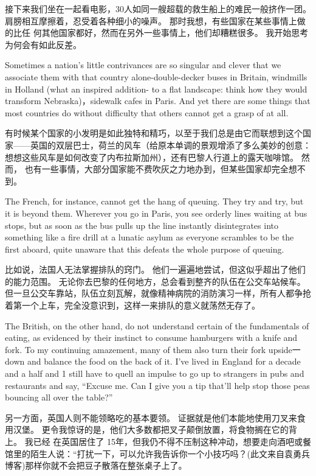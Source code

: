 \documentclass[cs4size, a4paper, 12pt]{article}
\newcounter{numpar}
\newcommand*{\newpar}{\numpar{}}
\begin{document}
	接下来我们坐在一起看电影，30人如同一艘超载的救生船上的难民一般挤作一团。 肩膀相互摩擦着，忍受着各种细小的噪声。 那时我想，有些国家在某些事情上做的比任 何其他国家都好，然而在另外一些事情上，他们却糟糕很多。 我开始思考为何会有如此反差。 
	
	\newpar Sometimes a nation's little contrivances are so singular and clever that we associate them with that country alone-double-decker buses in Britain, windmills in Holland (what an inspired addition- to a flat landscape: think how they would transform Nebraska)，sidewalk cafes in Paris. And yet there are some things that most countries do without difficulty that others cannot get a grasp of at all.
	
	有时候某个国家的小发明是如此独特和精巧，以至于我们总是由它而联想到这个国家——英国的双层巴士，荷兰的风车（给原本单调的景观增添了多么美妙的创意：想想这些风车是如何改变了内布拉斯加州），还有巴黎人行道上的露天咖啡馆。 然而， 也有一些事情，大部分国家能不费吹灰之力地办到，但某些国家却完全想不到。 
	
	\newpar The French, for instance, cannot get the hang of queuing. They try and try, but it is beyond them. Wherever you go in Paris, you see orderly lines waiting at bus stops, but as soon as the bus pulls up the line instantly disintegrates into something like a fire drill at a lunatic asylum as everyone scrambles to be the first aboard, quite unaware that this defeats the whole purpose of queuing.
	
	比如说，法国人无法掌握排队的窍门。 他们一遍遍地尝试，但这似乎超出了他们的能力范围。 无论你去巴黎的任何地方，总会看到整齐的队伍在公交车站候车。 但一旦公交车靠站，队伍立刻瓦解，就像精神病院的消防演习一样，所有人都争抢着第一个上车，完全没意识到，这样一来排队的意义就荡然无存了。 
	
	\newpar The British, on the other hand, do not understand certain of the fundamentals of eating, as evidenced by their instinct to consume hamburgers with a knife and fork. To my continuing amazement, many of them also turn their fork upside一down and balance the food on the back of it. I’ve lived in England for a decade and a half and 1 still have to quell an impulse to go up to strangers in pubs and restaurants and say, ``Excuse me. Can I give you a tip that'll help stop those peas bouncing all over the table?''
	
	另一方面，英国人则不能领略吃的基本要领。 证据就是他们本能地使用刀叉来食用汉堡。 更令我惊讶的是，他们大多数都把叉子颠倒放置，将食物搁在它的背上。 我已经 在英国居住了 15年，但我仍不得不压制这种冲动，想要走向酒吧或餐馆里的陌生人说：``打扰一下，可以允许我告诉你一个小技巧吗？(此文来自袁勇兵博客)那样你就不会把豆子散落在整张桌子上了。 
	
\end{document}
